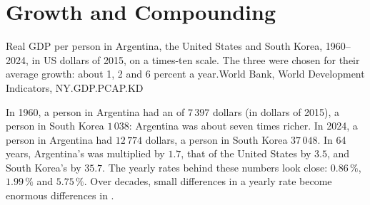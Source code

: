 \chapter{Growth and Compounding}\label{ch:g8:growth-and-compounding}

\begin{openingchart}{Real GDP per person in Argentina, the United States and South Korea,
1960--2024, in US dollars of 2015, on a times-ten scale. The three were chosen for their average
growth: about 1, 2 and 6 percent a year.}{World Bank, World Development Indicators,
NY.GDP.PCAP.KD}
\end{openingchart}

In 1960, a person in Argentina had an  of $7\,397$ dollars (in dollars of 2015), a person in
South Korea $1\,038$: Argentina was about seven times richer. In 2024, a person in Argentina had
$12\,774$ dollars, a person in South Korea $37\,048$. In 64 years, Argentina's 
was multiplied by $1.7$, that of the United States by $3.5$, and South Korea's by $35.7$. The
yearly rates behind these numbers look close: $0.86\,\%$, $1.99\,\%$ and $5.75\,\%$. Over decades,
small differences in a yearly rate become enormous differences in .

